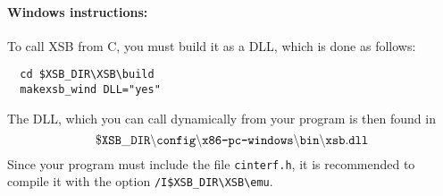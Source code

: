 \paragraph{Windows instructions:}
To call XSB from C, you must build it as a DLL, which is done as follows:
\begin{verbatim}
  cd $XSB_DIR\XSB\build
  makexsb_wind DLL="yes"
\end{verbatim}
The DLL, which you can call dynamically from your program is then found in 
\[
 \tt
 \$XSB\_DIR\backslash config\backslash \mbox{\tt x86-pc-windows}\backslash
 bin \backslash xsb.dll
\]
Since your program must include the file {\tt cinterf.h}, it is recommended
to compile it with the option \verb|/I$XSB_DIR\XSB\emu|.


